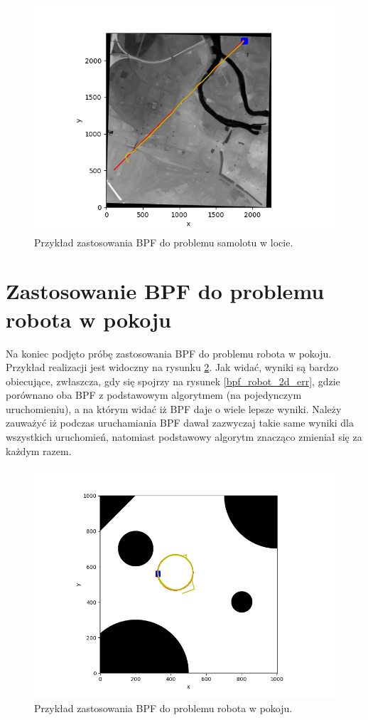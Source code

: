 \begin{figure}[H]
	\begin{center}
		\includegraphics[width=15cm]{./bpf_plane_wro.png}
		\caption{Przykład zastosowania BPF do problemu samolotu w locie.}
		\label{bpf_plane_wro}
	\end{center}
\end{figure}


\section{Zastosowanie BPF do problemu robota w pokoju}
Na koniec podjęto próbę zastosowania BPF do problemu robota w pokoju. Przykład realizacji jest widoczny na rysunku \ref{bpf_robot_2d}. Jak widać, wyniki są bardzo obiecujące, zwłaszcza, gdy się spojrzy na rysunek \ref{bpf_robot_2d_err}, gdzie porównano oba BPF z podstawowym algorytmem (na pojedynczym uruchomieniu), a na którym widać iż BPF daje o wiele lepsze wyniki. Należy zauważyć iż podczas uruchamiania BPF dawał zazwyczaj takie same wyniki dla wszystkich uruchomień, natomiast podstawowy algorytm znacząco zmieniał się za każdym razem.
\begin{figure}[H]
	\begin{center}
		\includegraphics[width=12cm]{./bpf_robot_2d.png}
		\caption{Przykład zastosowania BPF do problemu robota w pokoju.}
		\label{bpf_robot_2d}
	\end{center}
\end{figure}

